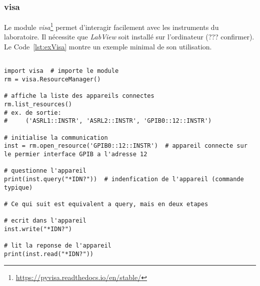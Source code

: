 \documentclass[11pt,francais]{book} %
\begin{document}
\begin{table}[]
\centering
{}
\caption{Modules nécessaires au fonctionnement des scripts du laboratoire}
\label{tableModulesNecessaires}
\end{table}

\subsubsection{visa}

Le module {\it visa}\footnote{\url{https://pyvisa.readthedocs.io/en/stable/}} permet d'interagir facilement avec les instruments du laboratoire.
Il nécessite que {\it LabView} soit installé sur l'ordinateur (??? confirmer).
Le Code~\ref{lst:exVisa} montre un exemple minimal de son utilisation.

\begin{lstlisting}[frame=single,caption={Exemple d'utilisation de {\it visa}},label={lst:exVisa},breaklines=true,]  % Start your code-block
 
import visa  # importe le module
rm = visa.ResourceManager()

# affiche la liste des appareils connectes
rm.list_resources()  
# ex. de sortie:
#     ('ASRL1::INSTR', 'ASRL2::INSTR', 'GPIB0::12::INSTR')

# initialise la communication
inst = rm.open_resource('GPIB0::12::INSTR')  # appareil connecte sur le permier interface GPIB a l'adresse 12

# questionne l'appareil
print(inst.query("*IDN?"))  # indenfication de l'appareil (commande typique)

# Ce qui suit est equivalent a query, mais en deux etapes

# ecrit dans l'appareil
inst.write("*IDN?")

# lit la reponse de l'appareil
print(inst.read("*IDN?"))

\end{lstlisting}
\end{document}
